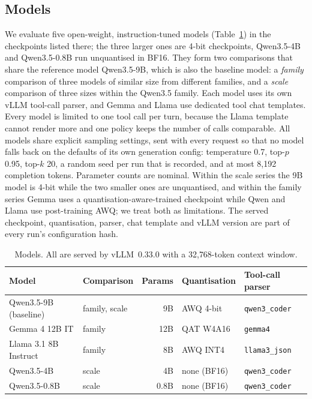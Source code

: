 \subsection{Models}
\label{sec:models}

We evaluate five open-weight, instruction-tuned models (Table~\ref{tab:models}) in the checkpoints listed there; the three larger ones are 4-bit checkpoints, Qwen3.5-4B and Qwen3.5-0.8B run unquantised in BF16. They form two comparisons that share the reference model Qwen3.5-9B, which is also the baseline model: a \emph{family} comparison of three models of similar size from different families, and a \emph{scale} comparison of three sizes within the Qwen3.5 family. Each model uses its own vLLM tool-call parser, and Gemma and Llama use dedicated tool chat templates. Every model is limited to one tool call per turn, because the Llama template cannot render more and one policy keeps the number of calls comparable. All models share explicit sampling settings, sent with every request so that no model falls back on the defaults of its own generation config: temperature 0.7, top-$p$ 0.95, top-$k$ 20, a random seed per run that is recorded, and at most 8{,}192 completion tokens. Parameter counts are nominal. Within the scale series the 9B model is 4-bit while the two smaller ones are unquantised, and within the family series Gemma uses a quantisation-aware-trained checkpoint while Qwen and Llama use post-training AWQ; we treat both as limitations. The served checkpoint, quantisation, parser, chat template and vLLM version are part of every run's configuration hash.

\begin{table}[t]
  \caption{Models. All are served by vLLM~0.33.0 with a 32{,}768-token context window.}
  \label{tab:models}
  \centering
  \small
  \begin{tabular}{@{}llrll@{}}
    \toprule
    Model & Comparison & Params & Quantisation & Tool-call parser \\
    \midrule
    Qwen3.5-9B (baseline) & family, scale & 9B & AWQ 4-bit & \texttt{qwen3\_coder} \\
    Gemma 4 12B IT & family & 12B & QAT W4A16 & \texttt{gemma4} \\
    Llama 3.1 8B Instruct & family & 8B & AWQ INT4 & \texttt{llama3\_json} \\
    Qwen3.5-4B & scale & 4B & none (BF16) & \texttt{qwen3\_coder} \\
    Qwen3.5-0.8B & scale & 0.8B & none (BF16) & \texttt{qwen3\_coder} \\
    \bottomrule
  \end{tabular}
\end{table}

